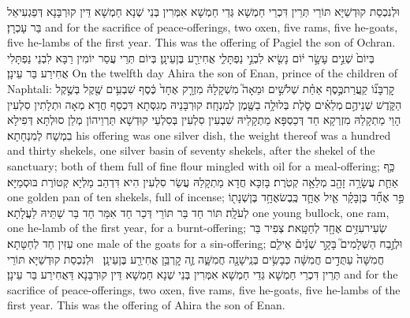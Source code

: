 {וּלְנִכְסַת קוּדְשַׁיָּא תּוֹרֵי תְּרֵין דִּכְרֵי חַמְשָׁא גְּדֵי חַמְשָׁא אִמְּרִין בְּנֵי שְׁנָא חַמְשָׁא דֵּין קוּרְבָּנָא דְּפַגְעִיאֵל בַּר עָכְרָן׃}
{and for the sacrifice of peace-offerings, two oxen, five rams, five he-goats, five he-lambs of the first year. This was the offering of Pagiel the son of Ochran.}{}
{בְּיוֹם֙ שְׁנֵ֣ים עָשָׂ֣ר י֔וֹם נָשִׂ֖יא לִבְנֵ֣י נַפְתָּלִ֑י אֲחִירַ֖ע בֶּן\maqqaf עֵינָֽן׃}
{בְּיוֹם תְּרֵי עֲסַר יוֹמִין רַבָּא לִבְנֵי נַפְתָּלִי אֲחִירַע בַּר עֵינָן׃}
{On the twelfth day Ahira the son of Enan, prince of the children of Naphtali:}{}
{קׇרְבָּנ֞וֹ קַֽעֲרַת\maqqaf כֶּ֣סֶף אַחַ֗ת שְׁלֹשִׁ֣ים וּמֵאָה֮ מִשְׁקָלָהּ֒ מִזְרָ֤ק אֶחָד֙ כֶּ֔סֶף שִׁבְעִ֥ים שֶׁ֖קֶל בְּשֶׁ֣קֶל הַקֹּ֑דֶשׁ שְׁנֵיהֶ֣ם \legarmeh  מְלֵאִ֗ים סֹ֛לֶת בְּלוּלָ֥ה בַשֶּׁ֖מֶן לְמִנְחָֽה׃}
{קוּרְבָּנֵיהּ מְגִסְּתָא דִּכְסַף חֲדָא מְאָה וּתְלָתִין סִלְעִין הָוֵי מַתְקָלַהּ מִזְרְקָא חַד דְּכַסְפָּא מַתְקָלֵיהּ שִׁבְעִין סִלְעִין בְּסִלְעֵי קוּדְשָׁא תַּרְוֵיהוֹן מְלַן סוּלְתָּא דְּפִילָא בִמְשַׁח לְמִנְחָתָא׃}
{his offering was one silver dish, the weight thereof was a hundred and thirty shekels, one silver basin of seventy shekels, after the shekel of the sanctuary; both of them full of fine flour mingled with oil for a meal-offering;}{}
{כַּ֥ף אַחַ֛ת עֲשָׂרָ֥ה זָהָ֖ב מְלֵאָ֥ה קְטֹֽרֶת׃}
{בָּזִכָּא חֲדָא מַתְקָלַהּ עֲשַׂר סִלְעִין הִיא דִּדְהַב מַלְיָא קְטוֹרֶת בּוּסְמַיָּא׃}
{one golden pan of ten shekels, full of incense;}{}
{פַּ֣ר אֶחָ֞ד בֶּן\maqqaf בָּקָ֗ר אַ֧יִל אֶחָ֛ד כֶּֽבֶשׂ\maqqaf אֶחָ֥ד בֶּן\maqqaf שְׁנָת֖וֹ לְעֹלָֽה׃}
{תּוֹר חַד בַּר תּוֹרֵי דְּכַר חַד אִמַּר חַד בַּר שַׁתֵּיהּ לַעֲלָתָא׃}
{one young bullock, one ram, one he-lamb of the first year, for a burnt-offering;}{}
{שְׂעִיר\maqqaf עִזִּ֥ים אֶחָ֖ד לְחַטָּֽאת׃}
{צְפִיר בַּר עִזִּין חַד לְחַטָּתָא׃}
{one male of the goats for a sin-offering;}{}
{וּלְזֶ֣בַח הַשְּׁלָמִים֮ בָּקָ֣ר שְׁנַ֒יִם֒ אֵילִ֤ם חֲמִשָּׁה֙ עַתֻּדִ֣ים חֲמִשָּׁ֔ה כְּבָשִׂ֥ים בְּנֵֽי\maqqaf שָׁנָ֖ה חֲמִשָּׁ֑ה זֶ֛ה קׇרְבַּ֥ן אֲחִירַ֖ע בֶּן\maqqaf עֵינָֽן׃ \petucha }
{וּלְנִכְסַת קוּדְשַׁיָּא תּוֹרֵי תְּרֵין דִּכְרֵי חַמְשָׁא גְּדֵי חַמְשָׁא אִמְּרִין בְּנֵי שְׁנָא חַמְשָׁא דֵּין קוּרְבָּנָא דַּאֲחִירַע בַּר עֵינָן׃}
{and for the sacrifice of peace-offerings, two oxen, five rams, five he-goats, five he-lambs of the first year. This was the offering of Ahira the son of Enan.}{}
